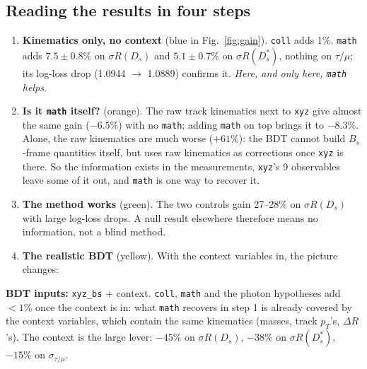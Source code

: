 \documentclass[10pt,a4paper]{article}
\newcommand{\code}[1]{\texttt{#1}}
\newcommand{\Ds}{D_s}
\newcommand{\Dss}{D_s^*}
\newcommand{\sR}{\sigma R}
\newcommand{\finding}[1]{\par\smallskip\noindent\colorbox{blue!6}{\parbox{\dimexpr\linewidth-2\fboxsep}{#1}}\par\smallskip}
\begin{document}
\begin{table}[H]
\centering\scriptsize
\caption{All \code{hypinfo\_full} BDTs: absolute precision (b20), out-of-fold log-loss (lower is better), and the change
relative to \code{xyz\_obs} in per cent.}

\end{table}

\subsection*{Reading the results in four steps}

\begin{enumerate}[label=\textbf{\arabic*.}]
\item \textbf{Kinematics only, no context} (blue in Fig.~\ref{fig:gain}). \code{coll} adds 1\%. \code{math} adds
  $7.5\pm0.8\%$ on $\sR(\Ds)$ and $5.1\pm0.7\%$ on $\sR(\Dss)$, nothing on $\tau/\mu$; its log-loss drop (1.0944
  $\to$ 1.0889) confirms it. \emph{Here, and only here, \code{math} helps.}
\item \textbf{Is it \code{math} itself?} (orange). The raw track kinematics next to \code{xyz} give almost the same
  gain ($-6.5\%$) with no \code{math}; adding \code{math} on top brings it to $-8.3\%$. Alone, the raw kinematics are
  much worse ($+61\%$): the BDT cannot build $B_s$-frame quantities itself, but uses raw kinematics as corrections once
  \code{xyz} is there. So the information exists in the measurements, \code{xyz}'s 9 observables leave some of it
  out, and \code{math} is one way to recover it.
\item \textbf{The method works} (green). The two controls gain 27--28\% on $\sR(\Ds)$ with large log-loss drops. A
  null result elsewhere therefore means no information, not a blind method.
\item \textbf{The realistic BDT} (yellow). With the context variables in, the picture changes:
\end{enumerate}

\begin{table}[H]
\centering\small
\caption{On top of \code{xyz} + context (38 features), paired bootstrap, b20.}\label{tab:ctx}

\end{table}

\finding{\textbf{BDT inputs:} \code{xyz\_bs} + context. \code{coll}, \code{math} and the photon hypotheses add
$<1\%$ once the context is in: what \code{math} recovers in step 1 is already covered by the context variables, which
contain the same kinematics (masses, track $p_T$'s, $\Delta R$'s). The context is the large lever: $-45\%$ on
$\sR(\Ds)$, $-38\%$ on $\sR(\Dss)$, $-15\%$ on $\sigma_{\tau/\mu}$.}
\end{document}
